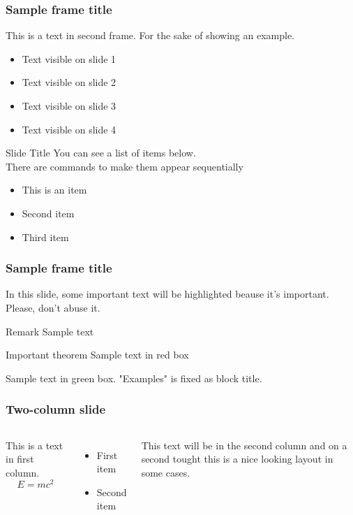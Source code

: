 \begin{frame}
	\frametitle{Sample frame title}
	This is a text in second frame. 
	For the sake of showing an example.
	
	\begin{itemize}
		\item<1-> Text visible on slide 1
		\item<2-> Text visible on slide 2
		\item<3> Text visible on slide 3
		\item<4-> Text visible on slide 4
	\end{itemize}
	
\end{frame}

\begin{slide}{Slide Title}
	You can see a list of items below. \pause \\
	There are commands to make them appear sequentially
	\begin{itemize}[type=1]
		\item<2> This is an item
		\item<3> Second item
		\item<4> Third item
	\end{itemize}
\end{slide}

\begin{frame}
	\frametitle{Sample frame title}
 
	In this slide, some important text will be \alert{highlighted} beause it's important. Please, don't abuse it.
 
	\begin{block}{Remark}
		Sample text
	\end{block}
	 
	\begin{alertblock}{Important theorem}
		Sample text in red box
	\end{alertblock}
 
	\begin{examples}
		Sample text in green box. "Examples" is fixed as block title.
	\end{examples}
\end{frame}

\begin{frame}
	\frametitle{Two-column slide}
	
	\begin{columns}
		
		This is a text in first column.
		$$E=mc^2$$
		\begin{itemize}
			\item First item
			\item Second item
		\end{itemize}
		
		This text will be in the second column
		and on a second tought this is a nice looking
		layout in some cases.
	\end{columns}
\end{frame}

